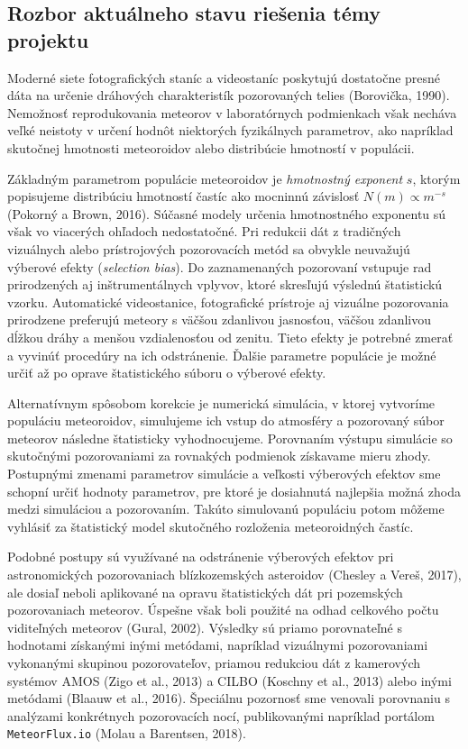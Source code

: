 \subsection{Rozbor aktuálneho stavu riešenia témy
projektu}\label{rozbor-aktuuxe1lneho-stavu-rieux161enia-tuxe9my-projektu}

Moderné siete fotografických staníc a videostaníc poskytujú dostatočne
presné dáta na určenie dráhových charakteristík pozorovaných telies
(Borovička, 1990). Nemožnosť reprodukovania meteorov v laboratórnych
podmienkach však necháva veľké neistoty v určení hodnôt niektorých
fyzikálnych parametrov, ako napríklad skutočnej hmotnosti meteoroidov
alebo distribúcie hmotností v populácii.

Základným parametrom populácie meteoroidov je \emph{hmotnostný exponent}
\(s\), ktorým popisujeme distribúciu hmotností častíc ako mocninnú
závislosť \(N(m) \propto m^{-s}\) (Pokorný a Brown, 2016). Súčasné
modely určenia hmotnostného exponentu sú však vo viacerých ohľadoch
nedostatočné. Pri redukcii dát z tradičných vizuálnych alebo
prístrojových pozorovacích metód sa obvykle neuvažujú výberové efekty
(\emph{selection bias}). Do zaznamenaných pozorovaní vstupuje rad
prirodzených aj inštrumentálnych vplyvov, ktoré skresľujú výslednú
štatistickú vzorku. Automatické videostanice, fotografické prístroje aj
vizuálne pozorovania prirodzene preferujú meteory s väčšou zdanlivou
jasnosťou, väčšou zdanlivou dĺžkou dráhy a menšou vzdialenosťou od
zenitu. Tieto efekty je potrebné zmerať a vyvinúť procedúry na ich
odstránenie. Ďalšie parametre populácie je možné určiť až po oprave
štatistického súboru o výberové efekty.

Alternatívnym spôsobom korekcie je numerická simulácia, v ktorej
vytvoríme populáciu meteoroidov, simulujeme ich vstup do atmosféry a
pozorovaný súbor meteorov následne štatisticky vyhodnocujeme. Porovnaním
výstupu simulácie so skutočnými pozorovaniami za rovnakých podmienok
získavame mieru zhody. Postupnými zmenami parametrov simulácie a
veľkosti výberových efektov sme schopní určiť hodnoty parametrov, pre
ktoré je dosiahnutá najlepšia možná zhoda medzi simuláciou a
pozorovaním. Takúto simulovanú populáciu potom môžeme vyhlásiť za
štatistický model skutočného rozloženia meteoroidných častíc.

Podobné postupy sú využívané na odstránenie výberových efektov pri
astronomických pozorovaniach blízkozemských asteroidov (Chesley a Vereš,
2017), ale dosiaľ neboli aplikované na opravu štatistických dát pri
pozemských pozorovaniach meteorov. Úspešne však boli použité na odhad
celkového počtu viditeľných meteorov (Gural, 2002). Výsledky sú priamo
porovnateľné s hodnotami získanými inými metódami, napríklad vizuálnymi
pozorovaniami vykonanými skupinou pozorovateľov, priamou redukciou dát z
kamerových systémov AMOS (Zigo et al., 2013) a CILBO (Koschny et al.,
2013) alebo inými metódami (Blaauw et al., 2016). Špeciálnu pozornosť
sme venovali porovnaniu s analýzami konkrétnych pozorovacích nocí,
publikovanými napríklad portálom \texttt{MeteorFlux.io} (Molau a
Barentsen, 2018).

